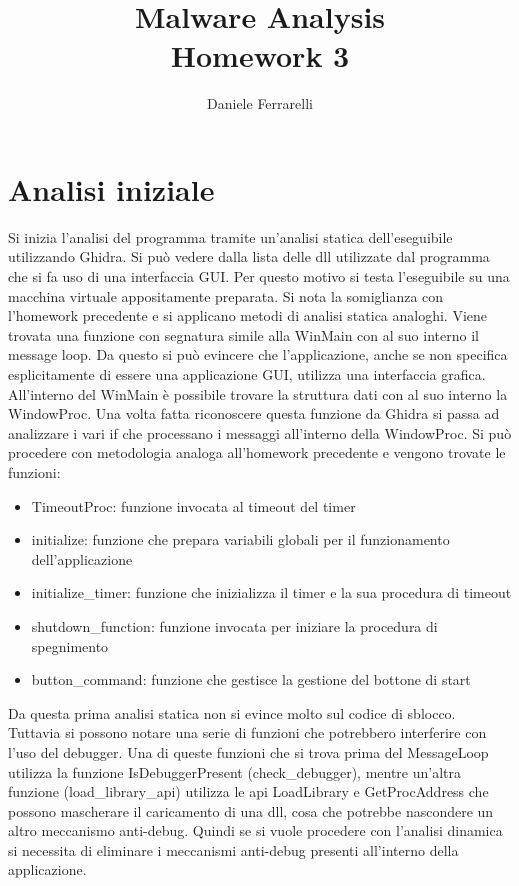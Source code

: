 \documentclass[a4paper,12pt]{article}
\title{Malware Analysis \\ \large Homework 3}
\author{Daniele Ferrarelli}
\date{}
\begin{document}
\maketitle

\section{Analisi iniziale}
Si inizia l'analisi del programma tramite un'analisi statica dell'eseguibile utilizzando Ghidra. Si può vedere  dalla lista delle dll utilizzate dal programma che si fa uso di una interfaccia GUI. Per questo motivo si testa l'eseguibile su una macchina virtuale appositamente preparata. Si nota la somiglianza con l'homework precedente e si applicano metodi di analisi statica analoghi. Viene trovata una funzione con segnatura simile alla WinMain con al suo interno il message loop. Da questo si può evincere che l'applicazione, anche se non specifica esplicitamente di essere una applicazione GUI, utilizza una interfaccia grafica. All'interno del WinMain è possibile trovare la struttura dati con al suo interno la WindowProc. Una volta fatta riconoscere questa funzione da Ghidra si passa ad analizzare i vari if che processano i messaggi all'interno della WindowProc. Si può procedere con metodologia analoga all'homework precedente e vengono trovate le funzioni:
\begin{itemize}
\item TimeoutProc: funzione invocata al timeout del timer
\item initialize: funzione che prepara variabili globali per il funzionamento dell'applicazione
\item initialize\_timer: funzione che inizializza il timer e la sua procedura di timeout
\item shutdown\_function: funzione invocata per iniziare la procedura di spegnimento
\item button\_command: funzione che gestisce la gestione del bottone di start
\end{itemize}
Da questa prima analisi statica non si evince molto sul codice di sblocco. Tuttavia si possono notare una serie di funzioni che potrebbero interferire con l'uso del debugger. Una di queste funzioni che si trova prima del MessageLoop utilizza la funzione IsDebuggerPresent (check\_debugger), mentre un'altra funzione (load\_library\_api) utilizza le api LoadLibrary e GetProcAddress che possono mascherare il caricamento di una dll, cosa che potrebbe nascondere un altro meccanismo anti-debug. Quindi se si vuole procedere con l'analisi dinamica si necessita di eliminare i meccanismi anti-debug presenti all'interno della applicazione. 
\end{document}
